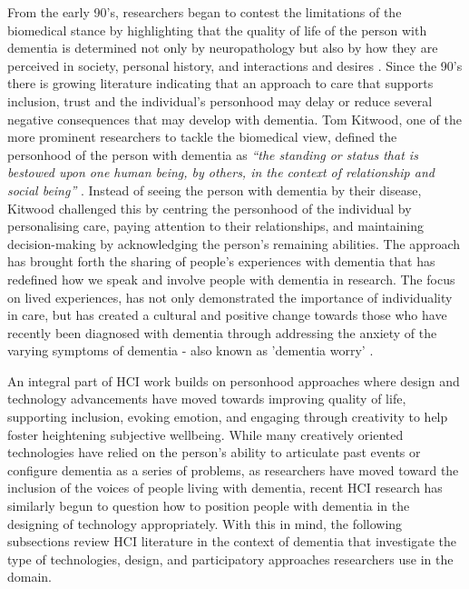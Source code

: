 From the early 90's, researchers began to contest the limitations of the biomedical stance by highlighting that the quality of life of the person with dementia is determined not only by neuropathology but also by how they are perceived in society, personal history, and interactions and desires \citep{o2007personhood}. Since the 90's there is growing literature indicating that an approach to care that supports inclusion, trust and the individual's personhood may delay or reduce several negative consequences that may develop with dementia. Tom Kitwood, one of the more prominent researchers to tackle the biomedical view, defined the personhood of the person with dementia as \textit{``the standing or status that is bestowed upon one human being, by others, in the context of relationship and social being''} \citep[p.8]{kitwood1997dementia}. Instead of seeing the person with dementia by their disease, Kitwood challenged this by centring the personhood of the individual by personalising care, paying attention to their relationships, and maintaining decision-making by acknowledging the person's remaining abilities. The approach has brought forth the sharing of people's experiences with dementia that has redefined how we speak and involve people with dementia in research. The focus on lived experiences, has not only demonstrated the importance of individuality in care, but has created a cultural and positive change towards those who have recently been diagnosed with dementia through addressing the anxiety of the varying symptoms of dementia - also known as 'dementia worry' \citep{kessler_dementia_2012}.

An integral part of HCI work builds on personhood approaches where design and technology advancements have moved towards improving quality of life, supporting inclusion, evoking emotion, and engaging through creativity to help foster heightening subjective wellbeing. While many creatively oriented technologies have relied on the person's ability to articulate past events or configure dementia as a series of problems, as researchers have moved toward the inclusion of the voices of people living with dementia, recent HCI research has similarly begun to question how to position people with dementia in the designing of technology appropriately. With this in mind, the following subsections review HCI literature in the context of dementia that investigate the type of technologies, design, and participatory approaches researchers use in the domain.

